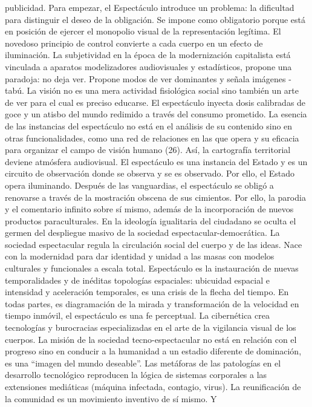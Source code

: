 \documentclass[
]{article}
\begin{document}
publicidad. Para empezar, el Espectáculo introduce un problema: la
dificultad para distinguir el deseo de la obligación. Se impone como
obligatorio porque está en posición de ejercer el monopolio visual de la
representación legítima. El novedoso principio de control convierte a
cada cuerpo en un efecto de iluminación. La subjetividad en la época de
la modernización capitalista está vinculada a aparatos modelizadores
audiovisuales y estadísticos, propone una paradoja: no deja ver. Propone
modos de ver dominantes y señala imágenes -tabú. La visión no es una
mera actividad fisiológica social sino también un arte de ver para el
cual es preciso educarse. El espectáculo inyecta dosis calibradas de
goce y un atisbo del mundo redimido a través del consumo prometido. La
esencia de las instancias del espectáculo no está en el análisis de su
contenido sino en otras funcionalidades, como una red de relaciones en
las que opera y su eficacia para organizar el campo de visión humano
(26). Así, la cartografía territorial deviene atmósfera audiovisual. El
espectáculo es una instancia del Estado y es un circuito de observación
donde se observa y se es observado. Por ello, el Estado opera
iluminando. Después de las vanguardias, el espectáculo se obligó a
renovarse a través de la mostración obscena de sus cimientos. Por ello,
la parodia y el comentario infinito sobre sí mismo, además de la
incorporación de nuevos productos paraculturales. En la ideología
igualitaria del ciudadano se oculta el germen del despliegue masivo de
la sociedad espectacular-democrática. La sociedad espectacular regula la
circulación social del cuerpo y de las ideas. Nace con la modernidad
para dar identidad y unidad a las masas con modelos culturales y
funcionales a escala total. Espectáculo es la instauración de nuevas
temporalidades y de inéditas topologías espaciales: ubicuidad espacial e
intensidad y aceleración temporales, es una crisis de la flecha del
tiempo. En todas partes, es diagramación de la mirada y transformación
de la velocidad en tiempo inmóvil, el espectáculo es una fe perceptual.
La cibernética crea tecnologías y burocracias especializadas en el arte
de la vigilancia visual de los cuerpos. La misión de la sociedad
tecno-espectacular no está en relación con el progreso sino en conducir
a la humanidad a un estadio diferente de dominación, es una ``imagen del
mundo deseable''. Las metáforas de las patologías en el desarrollo
tecnológico reproducen la lógica de sistemas corporales a las
extensiones mediáticas (máquina infectada, contagio, virus). La
reunificación de la comunidad es un movimiento inventivo de sí mismo. Y
\end{document}

